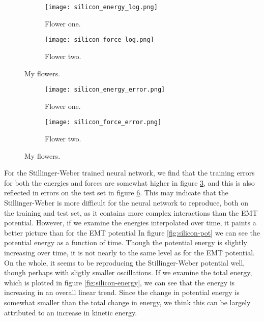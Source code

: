 \begin{figure}[H]
\begin{adjustbox}{max width=1.2\linewidth,center}
\centering
  \begin{subfigure}[b]{0.55\textwidth}
      \texttt{[image: silicon\_energy\_log.png]}
    \caption{Flower one.}
    \label{fig:f1}
  \end{subfigure}
  \hfill
  \begin{subfigure}[b]{0.55\textwidth}
      \texttt{[image: silicon\_force\_log.png]}
    \caption{Flower two.}
    \label{fig:f2}
  \end{subfigure}
\end{adjustbox}
\caption{My flowers.}
    \label{fig:silicon-log}
\end{figure}

\begin{figure}[H]
\begin{adjustbox}{max width=1.2\linewidth,center}
\centering
  \begin{subfigure}[b]{0.55\textwidth}
      \texttt{[image: silicon\_energy\_error.png]}
    \caption{Flower one.}
    \label{fig:f1}
  \end{subfigure}
  \hfill
  \begin{subfigure}[b]{0.55\textwidth}
      \texttt{[image: silicon\_force\_error.png]}
    \caption{Flower two.}
    \label{fig:f2}
  \end{subfigure}
\end{adjustbox}
\caption{My flowers.}
    \label{fig:silicon-error}
\end{figure}

For the Stillinger-Weber trained neural network, we find that
the training errors for both the energies and forces are somewhat higher
in figure \ref{fig:silicon-log},
and this is also reflected in errors on the test set in figure \ref{fig:silicon-error}.
This may indicate that the Stillinger-Weber is more difficult for the neural network
to reproduce, both on the training and test set, as it contains more complex interactions
than the EMT potential.
However, if we examine the energies interpolated over time,
it paints a better picture than for the EMT potential
In figure \ref{fig:silicon-pot} we can see the potential energy
as a function of time. Though the potential energy is slightly increasing
over time, it is not nearly to the same level as for the EMT potential.
On the whole, it seems to be reproducing the Stillinger-Weber potential
well, though perhaps with sligtly smaller oscillations.
If we examine the total energy, which is plotted in figure \ref{fig:silicon-energy},
we can see that the energy is increasing in an overall linear trend.
Since the change in potential energy is somewhat smaller than the total change
in energy, we think this can be largely attributed to an increase in kinetic energy.

